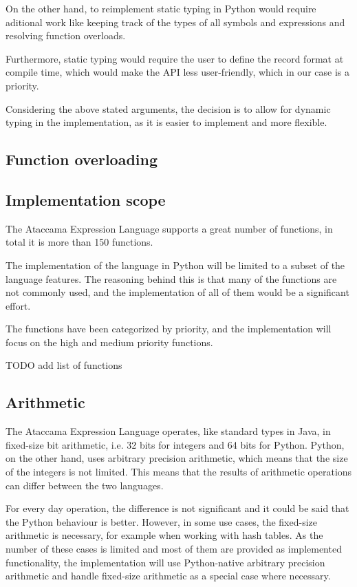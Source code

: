 On the other hand, to reimplement static typing in Python would require aditional work like keeping track of the types of all symbols and expressions and resolving function overloads. 

Furthermore, static typing would require the user to define the record format at compile time, which would make the API less user-friendly, which in our case is a priority.

Considering the above stated arguments, the decision is to allow for dynamic typing in the implementation, as it is easier to implement and more flexible.

\subsection{Function overloading}

\subsection{Implementation scope}

The Ataccama Expression Language supports a great number of functions, in total it is more than 150 functions. 

The implementation of the language in Python will be limited to a subset of the language features. The reasoning behind this is that many of the functions are not commonly used, and the implementation of all of them would be a significant effort.

The functions have been categorized by priority, and the implementation will focus on the high and medium priority functions. 

TODO add list of functions

\subsection{Arithmetic}

The Ataccama Expression Language operates, like standard types in Java, in fixed-size bit arithmetic, i.e. 32 bits for integers and 64 bits for Python. Python, on the other hand, uses arbitrary precision arithmetic, which means that the size of the integers is not limited. This means that the results of arithmetic operations can differ between the two languages.

For every day operation, the difference is not significant and it could be said that the Python behaviour is better. However, in some use cases, the fixed-size arithmetic is necessary, for example when working with hash tables. As the number of these cases is limited and most of them are provided as implemented functionality, the implementation will use Python-native arbitrary precision arithmetic and handle fixed-size arithmetic as a special case where necessary.

